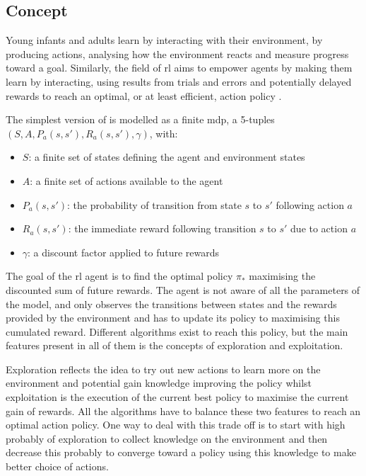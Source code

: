 \subsection{Concept}
	Young infants and adults learn by interacting with their environment, by producing actions, analysing how the environment reacts and measure progress toward a goal. Similarly, the field of \acrfull{rl} aims to empower agents by making them learn by interacting, using results from trials and errors and potentially delayed rewards to reach an optimal, or at least efficient, action policy \cite{sutton1998reinforcement}.

	The simplest version of  is modelled as a finite \acrfull{mdp}, a 5-tuples $(S, A, P_a(s,s'), R_a(s,s'), \gamma)$, with:
	\begin{itemize}
		\item $S$: a finite set of states defining the agent and environment states
		\item $A$: a finite set of actions available to the agent
		\item $P_a(s,s')$: the probability of transition from state $s$ to $s'$ following action $a$
		\item $R_a(s,s')$: the immediate reward following transition $s$ to $s'$ due to action $a$
		\item $\gamma$: a discount factor applied to future rewards
	\end{itemize}

	The goal of the \gls{rl} agent is to find the optimal policy $\pi_*$ maximising the discounted sum of future rewards. The agent is not aware of all the parameters of the model, and only observes the transitions between states and the rewards provided by the environment and has to update its policy to maximising this cumulated reward. Different algorithms exist to reach this policy, but the main features present in all of them is the concepts of exploration and exploitation.
	
	Exploration reflects the idea to try out new actions to learn more on the environment and potential gain knowledge improving the policy whilst exploitation is the execution of the current best policy to maximise the current gain of rewards. All the algorithms have to balance these two features to reach an optimal action policy. One way to deal with this trade off is to start with high probably of exploration to collect knowledge on the environment and then decrease this probably to converge toward a policy using this knowledge to make better choice of actions.
	
